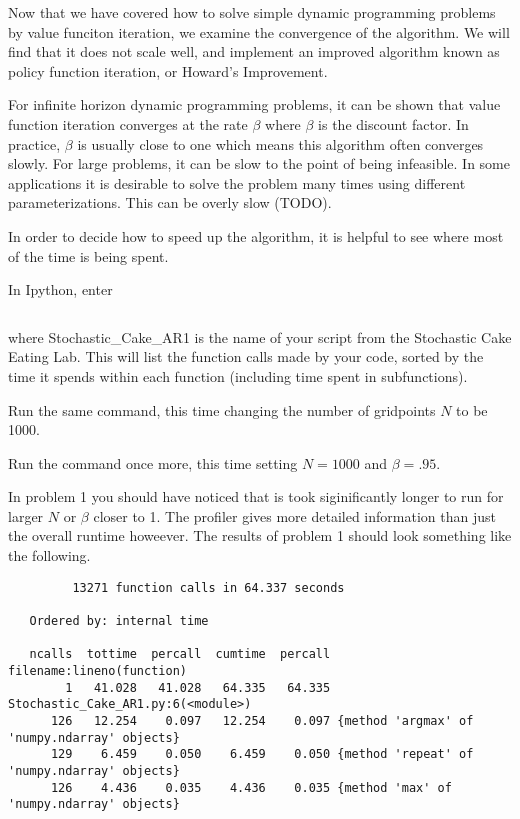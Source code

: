 

Now that we have covered how to solve simple dynamic programming problems by value funciton iteration, we examine the convergence of the algorithm.  We will find that it does not scale well, and implement an improved algorithm known as policy function iteration, or Howard's Improvement.

For infinite horizon dynamic programming problems, it can be shown that value function iteration converges at the rate $\beta$ where $\beta$ is the discount factor.  In practice, $\beta$ is usually close to one which means this algorithm often converges slowly.  For large problems, it can be slow to the point of being infeasible.  In some applications it is desirable to solve the problem many times using different parameterizations.  This can be  overly slow (TODO).

In order to decide how to speed up the algorithm, it is helpful to see where most of the time is being spent.

\begin{problem}
In Ipython, enter 
\begin{lstlisting}[style=python]
%run -p Stochastic_Cake_AR1 -s 'cumtime'
\end{lstlisting}
where Stochastic\_Cake\_AR1 is the name of your script from the Stochastic Cake Eating Lab.  This will list the function calls made by your code, sorted by the time it spends within each function (including time spent in subfunctions).

Run the same command, this time changing the number of gridpoints $N$ to be 1000.

Run the command once more, this time setting $N=1000$ and $\beta = .95$.
\end{problem}

In problem 1 you should have noticed that is took siginificantly longer to run for larger $N$ or $\beta$ closer to 1.  The profiler gives more detailed information than just the overall runtime howeever.  The results of problem 1 should look something like the following. 

\begin{lstlisting}[style=python]
%run -p Stochastic_Cake_AR1.py -s "cumtime"
         13271 function calls in 64.337 seconds

   Ordered by: internal time

   ncalls  tottime  percall  cumtime  percall filename:lineno(function)
        1   41.028   41.028   64.335   64.335 Stochastic_Cake_AR1.py:6(<module>)
      126   12.254    0.097   12.254    0.097 {method 'argmax' of 'numpy.ndarray' objects}
      129    6.459    0.050    6.459    0.050 {method 'repeat' of 'numpy.ndarray' objects}
      126    4.436    0.035    4.436    0.035 {method 'max' of 'numpy.ndarray' objects}
\end{lstlisting}

